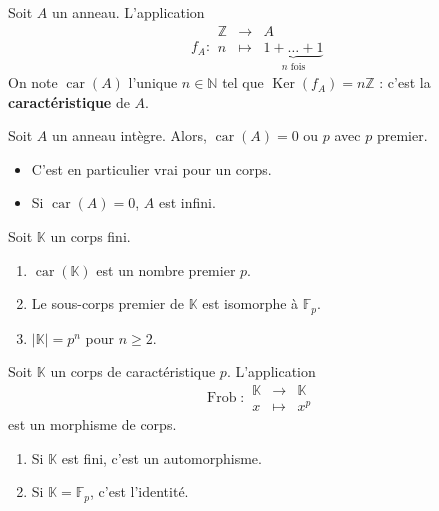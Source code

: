 	
	\begin{definition}
		Soit $A$ un anneau. L'application
		\[
			f_A :
			\begin{array}{ccc}
				\mathbb{Z} &\rightarrow& A \\
				n &\mapsto& \underbrace{1 + \dots + 1}_{n \text{ fois}}
			\end{array}
		\]
		On note $\operatorname{car}(A)$ l'unique $n \in \mathbb{N}$ tel que $\operatorname{Ker}(f_A) = n\mathbb{Z}$ : c'est la \textbf{caractéristique} de $A$.
	\end{definition}
	
	\begin{proposition}
		Soit $A$ un anneau intègre. Alors, $\operatorname{car}(A) = 0 \text{ ou } p$ avec $p$ premier.
	\end{proposition}
	
	\begin{remark}
		\begin{itemize}
			\item C'est en particulier vrai pour un corps.
			\item Si $\operatorname{car}(A) = 0$, $A$ est infini.
		\end{itemize}
	\end{remark}
	
	
	\begin{proposition}
		Soit $\mathbb{K}$ un corps fini.
		\begin{enumerate}[label=(\roman*)]
			\item $\operatorname{car}(\mathbb{K})$ est un nombre premier $p$.
			\item Le sous-corps premier de $\mathbb{K}$ est isomorphe à $\mathbb{F}_p$.
			\item $\vert \mathbb{K} \vert = p^n$ pour $n \geq 2$.
		\end{enumerate}
	\end{proposition}
	
	\begin{proposition}
		Soit $\mathbb{K}$ un corps de caractéristique $p$. L'application
		\[
			\operatorname{Frob} :
			\begin{array}{ccc}
				\mathbb{K} &\rightarrow& \mathbb{K} \\
				x &\mapsto& x^p
			\end{array}
		\]
		est un morphisme de corps.
		\begin{enumerate}[label=(\roman*)]
			\item Si $\mathbb{K}$ est fini, c'est un automorphisme.
			\item Si $\mathbb{K} = \mathbb{F}_p$, c'est l'identité.
		\end{enumerate}
	\end{proposition}
	
